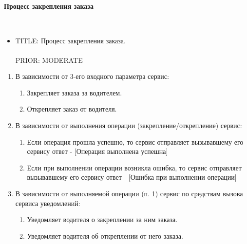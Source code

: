     \paragraph{Процесс закрепления заказа} \mbox{} \\

        \begin{itemize}

	        \item {
	          TITLE: Процесс закрепления заказа.\\
	          \\
	          PRIOR: MODERATE\\
	        }

     	   \end{itemize}

        \begin{alg} \label{alg_order_fastening} \mbox{}

	        \begin{enumerate}

	          \item В зависимости от 3-его входного параметра сервис:

              \begin{enumerate}
                \item Закрепляет заказа за водителем.
                \item Открепляет заказ от водителя.
              \end{enumerate}
	          
	          \item В зависимости от выполнения операции (закрепление/открепление) сервис:

              \begin{enumerate}
                \item Если операция прошла успешно, то сервис отправляет вызывавшему его сервису ответ - [Операция выполнена успешна]
                \item Если  при выполнении операции возникла ошибка, то сервис отправляет вызывавшему его сервису ответ - [Ошибка при выполнении операции]
              \end{enumerate}


            \item В зависимости от выполняемой операции (п. 1) сервис по средствам вызова сервиса уведомлений:

              \begin{enumerate}
                \item Уведомляет водителя о закреплении за ним заказа.
                \item Уведомляет водителя об откреплении от него заказа.
              \end{enumerate}

	        \end{enumerate}

        	\end{alg}